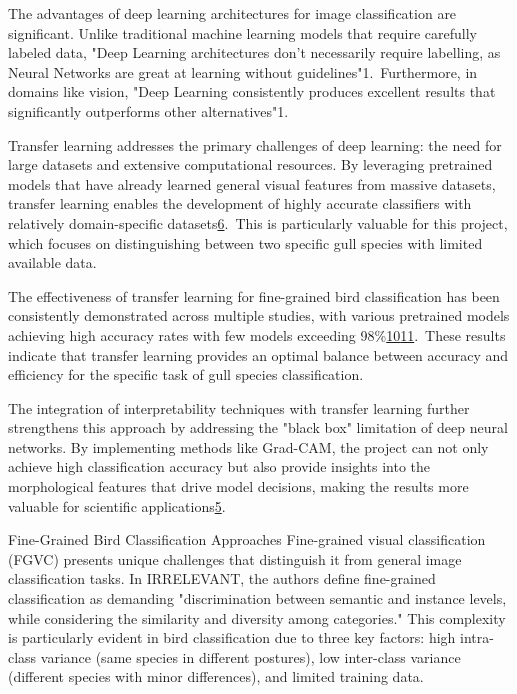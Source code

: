 \documentclass[a4paper,12pt]{article}
\begin{document}
The advantages of deep learning architectures for image classification are significant. Unlike traditional machine learning models that require carefully labeled data, "Deep Learning architectures don't necessarily require labelling, as Neural Networks are great at learning without guidelines"1. Furthermore, in domains like vision, "Deep Learning consistently produces excellent results that significantly outperforms other alternatives"1.

Transfer learning addresses the primary challenges of deep learning: the need for large datasets and extensive computational resources. By leveraging pretrained models that have already learned general visual features from massive datasets, transfer learning enables the development of highly accurate classifiers with relatively domain-specific datasets\href{https://arxiv.org/abs/2201.09679}{6}. This is particularly valuable for this project, which focuses on distinguishing between two specific gull species with limited available data.

The effectiveness of transfer learning for fine-grained bird classification has been consistently demonstrated across multiple studies, with various pretrained models achieving high accuracy rates with few models exceeding 98\%\href{https://www.semanticscholar.org/paper/41b0718279f408654094557156d4eeeb0067b2c4}{10}\href{https://www.semanticscholar.org/paper/770ee68d1b136cd098a018a399d1f69af29faae0}{11}. These results indicate that transfer learning provides an optimal balance between accuracy and efficiency for the specific task of gull species classification.

The integration of interpretability techniques with transfer learning further strengthens this approach by addressing the "black box" limitation of deep neural networks. By implementing methods like Grad-CAM, the project can not only achieve high classification accuracy but also provide insights into the morphological features that drive model decisions, making the results more valuable for scientific applications\href{https://www.atlantis-press.com/article/125986223.pdf}{5}.


Fine-Grained Bird Classification Approaches
Fine-grained visual classification (FGVC) presents unique challenges that distinguish it from general image classification tasks. In \citep{wei2021fine} IRRELEVANT, the authors define fine-grained classification as demanding "discrimination between semantic and instance levels, while considering the similarity and diversity among categories." This complexity is particularly evident in bird classification due to three key factors: high intra-class variance (same species in different postures), low inter-class variance (different species with minor differences), and limited training data\citep{he2022bird}.
\end{document}
